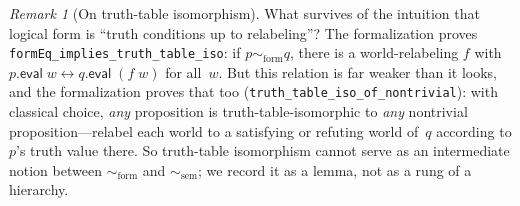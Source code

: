 \documentclass[jsl,bibother]{asl}
\theoremstyle{definition}
\theoremstyle{remark}
\newtheorem{remark}[theorem]{Remark}
\newcommand{\eval}{\mathsf{eval}}
\newcommand{\formEq}{\sim_{\mathrm{form}}}
\newcommand{\semEq}{\sim_{\mathrm{sem}}}
\begin{document}
\begin{remark}[On truth-table isomorphism]
\label{rem:tt-iso}
What survives of the intuition that logical form is
``truth conditions up to relabeling''?  The formalization proves
\texttt{formEq\_implies\_truth\_table\_iso}: if
$p \formEq q$, there is a world-relabeling $f$ with
$p.\eval\;w \leftrightarrow q.\eval\;(f\;w)$ for all~$w$.
But this relation is far weaker than it looks, and the
formalization proves that too
(\texttt{truth\_table\_iso\_of\_\allowbreak{}nontrivial}): with
classical choice, \emph{any} proposition is
truth-table-isomorphic to \emph{any} nontrivial
proposition---relabel each world to a satisfying or refuting
world of~$q$ according to $p$'s truth value there.  So
truth-table isomorphism cannot serve as an intermediate notion
between $\formEq$ and $\semEq$; we record it as a lemma, not as
a rung of a hierarchy.
\end{remark}
\end{document}
